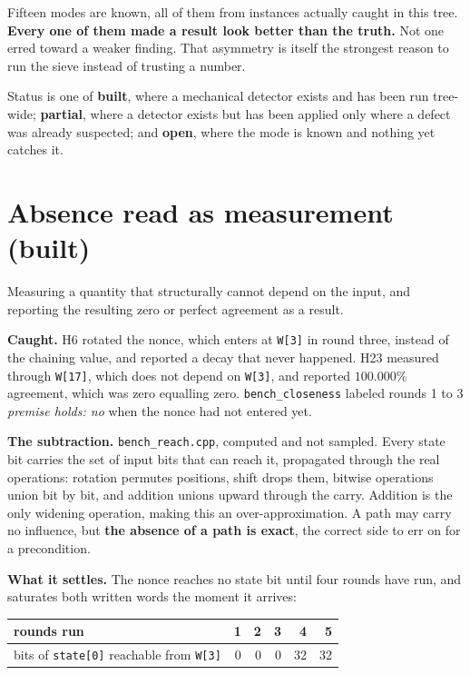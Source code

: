 Fifteen modes are known, all of them from instances actually caught in this tree. \textbf{Every one of them made a result look better than the truth.} Not one erred toward a weaker finding. That asymmetry is itself the strongest reason to run the sieve instead of trusting a number.

Status is one of \textbf{built}, where a mechanical detector exists and has been run tree-wide; \textbf{partial}, where a detector exists but has been applied only where a defect was already suspected; and \textbf{open}, where the mode is known and nothing yet catches it.

\section{Absence read as measurement (built)}

Measuring a quantity that structurally cannot depend on the input, and reporting the resulting zero or perfect agreement as a result.

\textbf{Caught.} H6 rotated the nonce, which enters at \texttt{W[3]} in round three, instead of the chaining value, and reported a decay that never happened. H23 measured through \texttt{W[17]}, which does not depend on \texttt{W[3]}, and reported \(100.000\%\) agreement, which was zero equalling zero. \texttt{bench\_closeness} labeled rounds 1 to 3 \emph{premise holds: no} when the nonce had not entered yet.

\textbf{The subtraction.} \texttt{bench\_reach.cpp}, computed and not sampled. Every state bit carries the set of input bits that can reach it, propagated through the real operations: rotation permutes positions, shift drops them, bitwise operations union bit by bit, and addition unions upward through the carry. Addition is the only widening operation, making this an over-approximation. A path may carry no influence, but \textbf{the absence of a path is exact}, the correct side to err on for a precondition.

\textbf{What it settles.} The nonce reaches no state bit until four rounds have run, and saturates both written words the moment it arrives:

\begin{center}
\begin{tabular}{@{}lrrrrr@{}}
\toprule
rounds run & 1 & 2 & 3 & 4 & 5 \\
\midrule
bits of \texttt{state[0]} reachable from \texttt{W[3]} & 0 & 0 & 0 & 32 & 32 \\
\bottomrule
\end{tabular}
\end{center}

